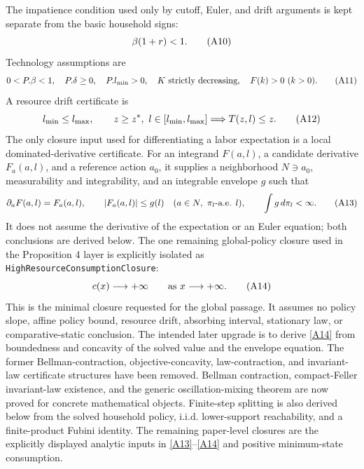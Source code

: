 \documentclass[11pt]{article}
\newcommand{\leanname}[1]{\nolinkurl{#1}}
\newcommand{\eqA}[1]{\refstepcounter{equation}\tag{A#1}}
\begin{document}
The impatience condition used only by cutoff, Euler, and drift arguments is
kept separate from the basic household signs:
\begin{equation}
 \beta(1+r)<1. \eqA{10}\label{A10}
\end{equation}
Technology assumptions are
\begin{equation}
 0<P.\beta<1,\quad P.\delta\ge0,\quad P.l_{\min}>0,
 \quad K\text{ strictly decreasing},\quad F(k)>0\ (k>0). \eqA{11}\label{A11}
\end{equation}
A resource drift certificate is
\begin{equation}
 l_{\min}\le l_{\max},\qquad z\ge z^*,\ l\in[l_{\min},l_{\max}]
 \Longrightarrow T(z,l)\le z. \eqA{12}\label{A12}
\end{equation}
The only closure input used for differentiating a labor expectation is a
local dominated-derivative certificate.  For an integrand $F(a,l)$, a
candidate derivative $F_a(a,l)$, and a reference action $a_0$, it supplies
a neighborhood $N\ni a_0$, measurability and integrability, and an
integrable envelope $g$ such that
\begin{equation}
 \partial_aF(a,l)=F_a(a,l),\qquad |F_a(a,l)|\le g(l)
 \quad(a\in N,\ \pi_l\text{-a.e. }l),\qquad \int g\,d\pi_l<\infty.
 \eqA{13}\label{A13}
\end{equation}
It does not assume the derivative of the expectation or an Euler equation;
both conclusions are derived below.
The one remaining global-policy closure used in the Proposition 4 layer is
explicitly isolated as \leanname{HighResourceConsumptionClosure}:
\begin{equation}
 c(x)\longrightarrow+\infty\qquad\text{as }x\longrightarrow+\infty.
 \eqA{14}\label{A14}
\end{equation}
This is the minimal closure requested for the global passage.  It assumes no
policy slope, affine policy bound, resource drift, absorbing interval,
stationary law, or comparative-static conclusion.  The intended later upgrade
is to derive \eqref{A14} from boundedness and concavity of the solved value and
the envelope equation.
The former Bellman-contraction, objective-concavity, law-contraction, and
invariant-law certificate structures have been removed.  Bellman contraction,
compact-Feller invariant-law existence, and the generic oscillation-mixing
theorem are now proved for concrete mathematical objects.  Finite-step
splitting is also derived below from the solved household policy, i.i.d.
lower-support reachability, and a finite-product Fubini identity.  The
remaining paper-level closures are the explicitly displayed analytic inputs
in \eqref{A13}--\eqref{A14} and positive minimum-state consumption.
\end{document}
